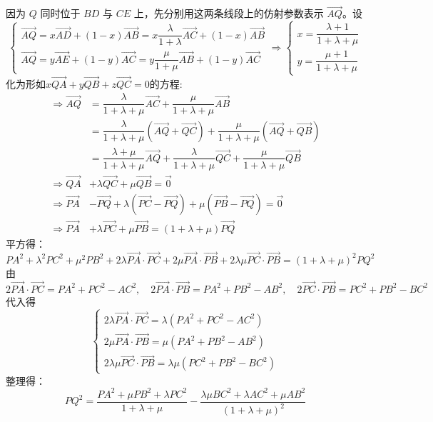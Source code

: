 \begin{solution}
      因为 $Q$ 同时位于 $BD$ 与 $CE$ 上，先分别用这两条线段上的仿射参数表示 $\overrightarrow{AQ}$。设
      \[
      \begin{cases}\overrightarrow{AQ}=x\overrightarrow{AD}+(1-x)\overrightarrow{AB}=x\dfrac{\lambda}{1+\lambda}\overrightarrow{AC}+(1-x)\overrightarrow{AB}\\[10pt]
      \overrightarrow{AQ}=y\overrightarrow{AE}+(1-y)\overrightarrow{AC}=y\dfrac{\mu}{1+\mu}\overrightarrow{AB}+(1-y)\overrightarrow{AC}\end{cases}\Rightarrow \begin{cases}x=\dfrac{\lambda+1}{1+\lambda+\mu}\\[8pt]y=\dfrac{\mu+1}{1+\lambda+\mu}\end{cases}
      \]
      化为形如$x\overrightarrow{QA}+y\overrightarrow{QB}+z\overrightarrow{QC}=0$的方程:
      \begin{align*}
          \Rightarrow \overrightarrow{AQ}&=\dfrac{\lambda}{1+\lambda+\mu}\overrightarrow{AC}+\dfrac{\mu}{1+\lambda+\mu}\overrightarrow{AB}\\
          &=\dfrac{\lambda}{1+\lambda+\mu}(\overrightarrow{AQ}+\overrightarrow{QC})+\dfrac{\mu}{1+\lambda+\mu}(\overrightarrow{AQ}+\overrightarrow{QB})\\
          &=\dfrac{\lambda+\mu}{1+\lambda+\mu}\overrightarrow{AQ}+\dfrac{\lambda}{1+\lambda+\mu}\overrightarrow{QC}+\dfrac{\mu}{1+\lambda+\mu}\overrightarrow{QB}\\
          \Rightarrow \overrightarrow{QA}&+\lambda\overrightarrow{QC}+\mu\overrightarrow{QB}=\vec{0}\\
          \Rightarrow \overrightarrow{PA}&-\overrightarrow{PQ}+\lambda(\overrightarrow{PC}-\overrightarrow{PQ})+\mu(\overrightarrow{PB}-\overrightarrow{PQ})=\vec{0}\\
          \Rightarrow \overrightarrow{PA}&+\lambda\overrightarrow{PC}+\mu\overrightarrow{PB}=(1+\lambda+\mu)\overrightarrow{PQ}
      \end{align*}
    平方得：\[
PA^2+\lambda^2PC^2+\mu^2PB^2+2\lambda\overrightarrow{PA}\cdot\overrightarrow{PC}+2\mu\overrightarrow{PA}\cdot\overrightarrow{PB}+2\lambda\mu\overrightarrow{PC}\cdot\overrightarrow{PB}=(1+\lambda+\mu)^2PQ^2\]
由
\[
2\overrightarrow{PA}\cdot\overrightarrow{PC}=PA^2+PC^2-AC^2,\quad
2\overrightarrow{PA}\cdot\overrightarrow{PB}=PA^2+PB^2-AB^2,\quad
2\overrightarrow{PC}\cdot\overrightarrow{PB}=PC^2+PB^2-BC^2
\]
代入得
\[\begin{cases}2\lambda\overrightarrow{PA}\cdot\overrightarrow{PC}=\lambda(PA^2+PC^2-AC^2)\\
    2\mu\overrightarrow{PA}\cdot\overrightarrow{PB}=\mu(PA^2+PB^2-AB^2)\\
    2\lambda\mu\overrightarrow{PC}\cdot\overrightarrow{PB}=\lambda\mu(PC^2+PB^2-BC^2)
\end{cases}\]
    整理得：\[
    PQ^2=\dfrac{PA^2+\mu PB^2+\lambda PC^2}{1+\lambda+\mu}-\dfrac{\lambda\mu BC^2+\lambda AC^2+\mu AB^2}{\left(1+\lambda+\mu\right)^2}\]
\end{solution}
